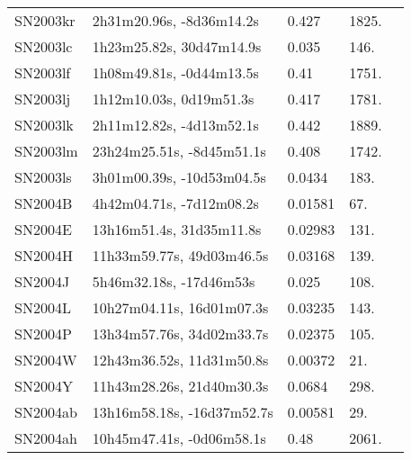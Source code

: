 \begin{longtable}{lllll}
         SN2003kr &       2h31m20.96s, -8d36m14.2s &    0.427 &          1825. &    \citet{2006AJ....131.1648B} \\
         SN2003lc &       1h23m25.82s, 30d47m14.9s &    0.035 &           146. &    \citet{1991RC3.9.C...0000d} \\
         SN2003lf &       1h08m49.81s, -0d44m13.5s &     0.41 &          1751. &    \citet{2006AJ....131.1648B} \\
         SN2003lj &        1h12m10.03s, 0d19m51.3s &    0.417 &          1781. &    \citet{2006AJ....131.1648B} \\
         SN2003lk &       2h11m12.82s, -4d13m52.1s &    0.442 &          1889. &    \citet{2007ApJ...666..674M} \\
         SN2003lm &      23h24m25.51s, -8d45m51.1s &    0.408 &          1742. &    \citet{2006AJ....131.1648B} \\
         SN2003ls &      3h01m00.39s, -10d53m04.5s &   0.0434 &           183. &    \citet{2004IAUC.8271A...1F} \\
          SN2004B &       4h42m04.71s, -7d12m08.2s &  0.01581 &            67. &    \citet{2012ApJS..199...26H} \\
          SN2004E &       13h16m51.4s, 31d35m11.8s &  0.02983 &           131. &    \citet{2006PrivC.U..D....W} \\
          SN2004H &      11h33m59.77s, 49d03m46.5s &  0.03168 &           139. &    \citet{2000MNRAS.313..469S} \\
          SN2004J &        5h46m32.18s, -17d46m53s &    0.025 &           108. &    \citet{2004IAUC.8277B...1M} \\
          SN2004L &      10h27m04.11s, 16d01m07.3s &  0.03235 &           143. &    \citet{2011AJ....142..170H} \\
          SN2004P &      13h34m57.76s, 34d02m33.7s &  0.02375 &           105. &  \citet{1995AandAS..112..429F} \\
          SN2004W &      12h43m36.52s, 11d31m50.8s &  0.00372 &            21. &    \citet{2011ApJ...736...65T} \\
          SN2004Y &      11h43m28.26s, 21d40m30.3s &   0.0684 &           298. &    \citet{2007SDSS6.C...0000:} \\
         SN2004ab &     13h16m58.18s, -16d37m52.7s &  0.00581 &            29. &    \citet{2011ApJS..197...28P} \\
         SN2004ah &      10h45m47.41s, -0d06m58.1s &     0.48 &          2061. &    \citet{2004IAUC.8296C...1R} \\

\end{longtable}
